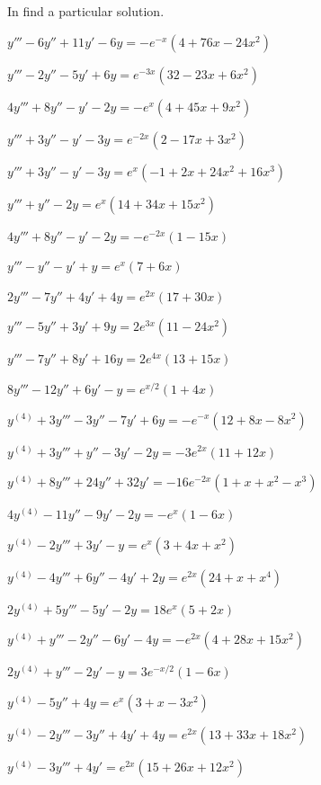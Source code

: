 \exercises
In  find a particular solution.

\begin{exerciselist}

\item\label{exer:9.3.1}$y'''-6y''+11y'-6y=-e^{-x}(4+76x-24x^2)$
\item\label{exer:9.3.2}$y'''-2y''-5y'+6y=e^{-3x}(32-23x+6x^2)$
\item\label{exer:9.3.3}$4y'''+8y''-y'-2y=-e^x(4+45x+9x^2)$
\item\label{exer:9.3.4}$y'''+3y''-y'-3y=e^{-2x}(2-17x+3x^2)$
\item\label{exer:9.3.5}$y'''+3y''-y'-3y=e^x(-1+2x+24x^2+16x^3)$
\item\label{exer:9.3.6}$y'''+y''-2y=e^x(14+34x+15x^2)$
\item\label{exer:9.3.7}$4y'''+8y''-y'-2y=-e^{-2x}(1-15x)$
\item\label{exer:9.3.8}$y'''-y''-y'+y=e^x(7+6x)$
\item\label{exer:9.3.9}$2y'''-7y''+4y'+4y=e^{2x}(17+30x)$
\item\label{exer:9.3.10}$y'''-5y''+3y'+9y=2e^{3x}(11-24x^2)$
\item\label{exer:9.3.11}$y'''-7y''+8y'+16y=2e^{4x}(13+15x)$
\item\label{exer:9.3.12}$8y'''-12y''+6y'-y=e^{x/2}(1+4x)$
\item\label{exer:9.3.13}$y^{(4)}+3y'''-3y''-7y'+6y=-e^{-x}(12+8x-8x^2)$
\item\label{exer:9.3.14}$y^{(4)}+3y'''+y''-3y'-2y=-3e^{2x}(11+12x)$
\item\label{exer:9.3.15}$y^{(4)}+8y'''+24y''+32y'=-16e^{-2x}(1+x+x^2-x^3)$
\item\label{exer:9.3.16}$4y^{(4)}-11y''-9y'-2y=-e^x(1-6x)$
\item\label{exer:9.3.17}$y^{(4)}-2y'''+3y'-y=e^x(3+4x+x^2)$
\item\label{exer:9.3.18}$y^{(4)}-4y'''+6y''-4y'+2y=e^{2x}(24+x+x^4)$
\item\label{exer:9.3.19}$2y^{(4)}+5y'''-5y'-2y=18e^x(5+2x)$
\item\label{exer:9.3.20}$y^{(4)}+y'''-2y''-6y'-4y=-e^{2x}(4+28x+15x^2)$
\item\label{exer:9.3.21}$2y^{(4)}+y'''-2y'-y=3e^{-x/2}(1-6x)$
\item\label{exer:9.3.22}$y^{(4)}-5y''+4y=e^x(3+x-3x^2)$
\item\label{exer:9.3.23}$y^{(4)}-2y'''-3y''+4y'+4y=e^{2x}(13+33x+18x^2)$
\item\label{exer:9.3.24}$y^{(4)}-3y'''+4y'=e^{2x}(15+26x+12x^2)$

\end{exerciselist}
